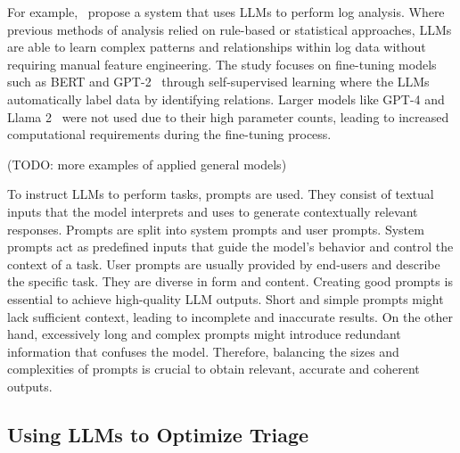 For example,\ \citet{karlsen2024large} propose a system that uses LLMs to perform log analysis.
Where previous methods of analysis relied on rule-based or statistical approaches, LLMs are able to learn complex
patterns and relationships within log data without requiring manual feature engineering.
The study focuses on fine-tuning models such as BERT and GPT-2\ \citep{radford2019language} through self-supervised
learning where the LLMs automatically label data by identifying relations.
Larger models like GPT-4 and Llama 2\ \citep{touvron2023llama} were not used due to their high parameter counts,
leading to increased computational requirements during the fine-tuning process.

(TODO: more examples of applied general models) %

To instruct LLMs to perform tasks, prompts are used.
They consist of textual inputs that the model interprets and uses to generate contextually relevant responses.
Prompts are split into system prompts and user prompts.
System prompts act as predefined inputs that guide the model's behavior and control the context of a task.
User prompts are usually provided by end-users and describe the specific task.
They are diverse in form and content.
Creating good prompts is essential to achieve high-quality LLM outputs.
Short and simple prompts might lack sufficient context, leading to incomplete and inaccurate results.
On the other hand, excessively long and complex prompts might introduce redundant information that confuses the model.
Therefore, balancing the sizes and complexities of prompts is crucial to obtain relevant, accurate and coherent outputs.

\subsection{Using LLMs to Optimize Triage}
\label{subsec:rq1-llms-in-context}

